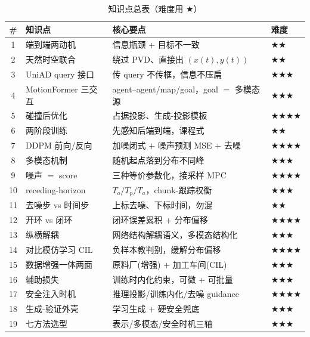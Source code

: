\begin{table}[H]\centering\small
\caption{知识点总表（难度用 \texorpdfstring{$\bigstar$}{star}）}
\begin{tabular}{clll}
\toprule
\# & 知识点 & 核心要点 & 难度 \\
\midrule
1 & 端到端两动机 & 信息瓶颈 $+$ 目标不一致 & \(\bigstar\bigstar\) \\
2 & 天然时空联合 & 绕过 PVD、直接出 $(x(t),y(t))$ & \(\bigstar\bigstar\) \\
3 & UniAD query 接口 & 传 query 不传框，信息不压扁 & \(\bigstar\bigstar\bigstar\) \\
4 & MotionFormer 三交互 & agent--agent/map/goal，goal $=$ 多模态源 & \(\bigstar\bigstar\bigstar\) \\
5 & 碰撞后优化 & 占据投影、生成-投影模板 & \(\bigstar\bigstar\bigstar\bigstar\) \\
6 & 两阶段训练 & 先感知后端到端，课程式 & \(\bigstar\bigstar\) \\
7 & DDPM 前向/反向 & 加噪闭式 $+$ 噪声预测 MSE $+$ 去噪 & \(\bigstar\bigstar\bigstar\bigstar\) \\
8 & 多模态机制 & 随机起点落到分布不同峰 & \(\bigstar\bigstar\bigstar\) \\
9 & 噪声 $=$ score & 三种等价参数化，接采样 MPC & \(\bigstar\bigstar\bigstar\bigstar\) \\
10 & receding-horizon & $T_o/T_p/T_a$，chunk-跟踪权衡 & \(\bigstar\bigstar\bigstar\) \\
11 & 去噪步 vs 时间步 & 上标去噪、下标时间，勿混 & \(\bigstar\bigstar\) \\
12 & 开环 vs 闭环 & 闭环误差累积 $+$ 分布偏移 & \(\bigstar\bigstar\bigstar\bigstar\) \\
13 & 纵横解耦 & 网络结构解耦语义，多模态结构化 & \(\bigstar\bigstar\bigstar\) \\
14 & 对比模仿学习 CIL & 负样本教判别，缓解分布偏移 & \(\bigstar\bigstar\bigstar\bigstar\) \\
15 & 数据增强一体两面 & 原料厂(增强) $+$ 加工车间(CIL) & \(\bigstar\bigstar\bigstar\) \\
16 & 辅助损失 & 训练时内化约束，可微 $+$ 可批量 & \(\bigstar\bigstar\bigstar\) \\
17 & 安全注入时机 & 推理投影/训练内化/去噪 guidance & \(\bigstar\bigstar\bigstar\bigstar\) \\
18 & 生成-验证外壳 & 学习生成 $+$ 硬安全兜底 & \(\bigstar\bigstar\bigstar\) \\
19 & 七方法选型 & 表示/多模态/安全时机三轴 & \(\bigstar\bigstar\bigstar\) \\
\bottomrule
\end{tabular}
\end{table}

